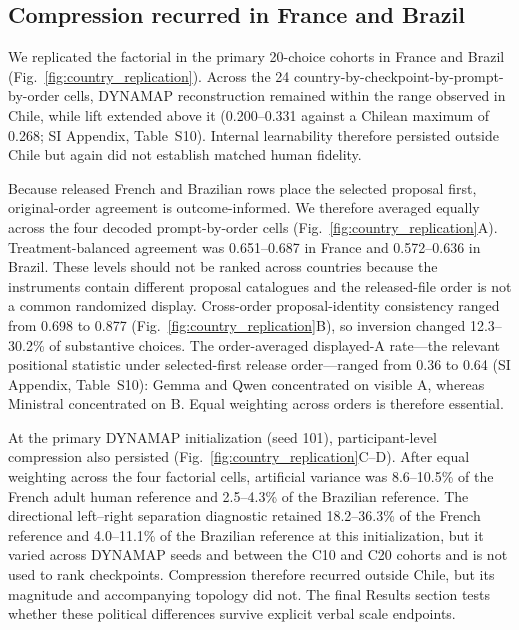 \documentclass[unnumsec,webpdf,modern,large]{oup-authoring-template}
\begin{document}
\subsection{Compression recurred in France and Brazil}

We replicated the factorial in the primary 20-choice cohorts in France and Brazil (Fig.~\ref{fig:country_replication}). Across the 24 country-by-checkpoint-by-prompt-by-order cells, DYNAMAP reconstruction remained within the range observed in Chile, while lift extended above it (0.200--0.331 against a Chilean maximum of 0.268; SI Appendix, Table~S10). Internal learnability therefore persisted outside Chile but again did not establish matched human fidelity.

Because released French and Brazilian rows place the selected proposal first, original-order agreement is outcome-informed. We therefore averaged equally across the four decoded prompt-by-order cells (Fig.~\ref{fig:country_replication}A). Treatment-balanced agreement was 0.651--0.687 in France and 0.572--0.636 in Brazil. These levels should not be ranked across countries because the instruments contain different proposal catalogues and the released-file order is not a common randomized display. Cross-order proposal-identity consistency ranged from 0.698 to 0.877 (Fig.~\ref{fig:country_replication}B), so inversion changed 12.3--30.2\% of substantive choices. The order-averaged displayed-A rate---the relevant positional statistic under selected-first release order---ranged from 0.36 to 0.64 (SI Appendix, Table~S10): Gemma and Qwen concentrated on visible A, whereas Ministral concentrated on B. Equal weighting across orders is therefore essential.

At the primary DYNAMAP initialization (seed 101), participant-level compression also persisted (Fig.~\ref{fig:country_replication}C--D). After equal weighting across the four factorial cells, artificial variance was 8.6--10.5\% of the French adult human reference and 2.5--4.3\% of the Brazilian reference. The directional left--right separation diagnostic retained 18.2--36.3\% of the French reference and 4.0--11.1\% of the Brazilian reference at this initialization, but it varied across DYNAMAP seeds and between the C10 and C20 cohorts and is not used to rank checkpoints. Compression therefore recurred outside Chile, but its magnitude and accompanying topology did not. The final Results section tests whether these political differences survive explicit verbal scale endpoints.
\end{document}
